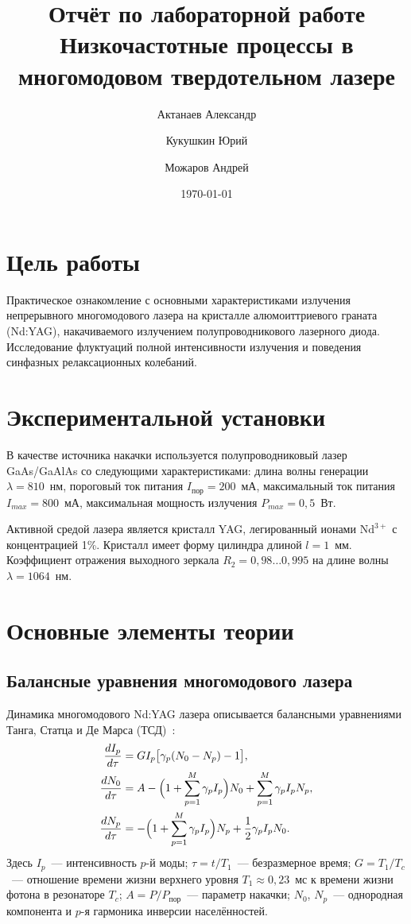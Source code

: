 \documentclass[12pt,a4paper]{article}
\title{\textbf{Отчёт по лабораторной работе}\\
\large Низкочастотные процессы в многомодовом твердотельном лазере}
\author{Актанаев Александр \and Кукушкин Юрий \and Можаров Андрей}
\date{\today}
\begin{document}
\maketitle
\tableofcontents
\newpage

\section{Цель работы}

Практическое ознакомление с основными характеристиками излучения непрерывного
многомодового лазера на кристалле алюмоиттриевого граната (Nd:YAG), накачиваемого
излучением полупроводникового лазерного диода. Исследование флуктуаций полной
интенсивности излучения и поведения синфазных релаксационных колебаний.

\section{Экспериментальной установки}

В качестве источника накачки используется полупроводниковый лазер GaAs/GaAlAs со следующими характеристиками:
длина волны генерации $\lambda = 810$~нм,
пороговый ток питания $I_\text{пор} = 200$~мА,
максимальный ток питания $I_{max} = 800$~мА,
максимальная мощность излучения $P_{max} = 0{,}5$~Вт.

Активной средой лазера является кристалл YAG, легированный ионами
$\mathrm{Nd}^{3+}$ с концентрацией 1\%. Кристалл имеет форму цилиндра длиной
$l = 1$~мм. Коэффициент отражения выходного зеркала
$R_2 = 0{,}98\ldots0{,}995$ на длине волны $\lambda = 1064$~нм.

\section{Основные элементы теории}

\subsection{Балансные уравнения многомодового лазера}

Динамика многомодового Nd:YAG лазера описывается балансными уравнениями
Танга, Статца и Де Марса (ТСД)~\cite{tang1963}:
\begin{align}
  \frac{dI_p}{d\tau} &= G I_p \bigl[\gamma_p(N_0 - N_p) - 1\bigr], \label{eq:I}\\
  \frac{dN_0}{d\tau} &= A - \Bigl(1 + \sum_{p=1}^{M}\gamma_p I_p\Bigr)N_0
                        + \sum_{p=1}^{M}\gamma_p I_p N_p, \label{eq:N0}\\
  \frac{dN_p}{d\tau} &= -\Bigl(1 + \sum_{p=1}^{M}\gamma_p I_p\Bigr)N_p
                        + \frac{1}{2}\gamma_p I_p N_0. \label{eq:Np}
\end{align}
Здесь $I_p$~--- интенсивность $p$-й моды; $\tau = t/T_1$~--- безразмерное
время; $G = T_1/T_c$~--- отношение времени жизни верхнего уровня $T_1 \approx 0{,}23$~мс к
времени жизни фотона в резонаторе $T_c$; $A = P/P_\text{пор}$~---
параметр накачки; $N_0$, $N_p$~--- однородная компонента и $p$-я гармоника
инверсии населённостей.
\end{document}
